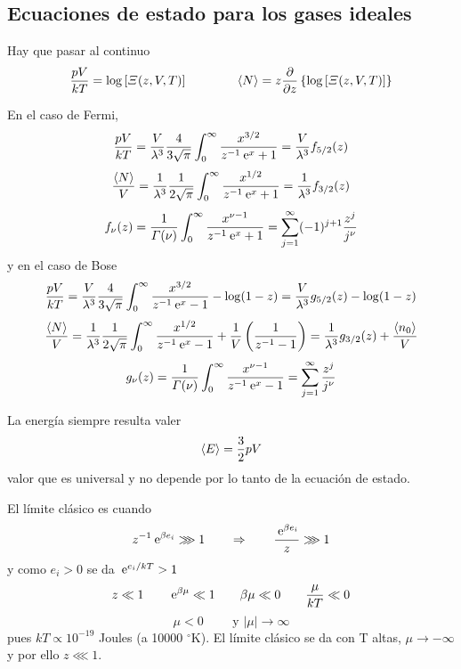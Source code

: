 \documentclass[10pt,oneside]{CBFT_book}
\begin{document}
\subsection{Ecuaciones de estado para los gases ideales}

Hay que pasar al continuo
\[
	\frac{pV}{kT} = \log \left[ \Xi (z,V,T) \right] \qquad \qquad 
	\braket{N} = z\frac{\partial^{\hspace{-0.05em}} {}}{\partial {z}^{\hspace{-0.05em}}}\left\{ \log \left[ \Xi (z,V,T) \right] \right\}
\]

En el caso de Fermi,
\[
	\frac{pV}{kT} = \frac{V}{\lambda^3} \frac{4}{3\sqrt{\pi}} \int_0^\infty 
	\frac{x^{3/2}}{z^{-1}\:\mathrm{e}^x + 1} = \frac{V}{\lambda^3} f_{5/2}(z)
\]
\[
	\frac{\braket{N}}{V} = \frac{1}{\lambda^3} \frac{1}{2\sqrt{\pi}} \int_0^\infty 
	\frac{x^{1/2}}{z^{-1}\:\mathrm{e}^x + 1} = \frac{1}{\lambda^3} f_{3/2}(z)
\]
\[
	f_\nu(z) = \frac{1}{\Gamma(\nu)} \int_0^\infty \frac{x^{\nu - 1}}{z^{-1}\:\mathrm{e}^x + 1} =
	\sum_{j=1}^\infty (-1)^{j+1} \frac{z^j}{j^\nu}
\]
y en el caso de Bose
\[
	\frac{pV}{kT} = \frac{V}{\lambda^3} \frac{4}{3\sqrt{\pi}} \int_0^\infty 
	\frac{x^{3/2}}{z^{-1}\:\mathrm{e}^x - 1} - \log ( 1 - z ) = 
	\frac{V}{\lambda^3} g_{5/2}(z) - \log ( 1 - z )
\]
\[
	\frac{\braket{N}}{V} = \frac{1}{\lambda^3} \frac{1}{2\sqrt{\pi}} \int_0^\infty 
	\frac{x^{1/2}}{z^{-1}\:\mathrm{e}^x - 1} + \frac{1}{V} \left( \frac{ 1 }{ z^{-1} - 1 } \right) = 
	\frac{1}{\lambda^3} g_{3/2}(z) + \frac{\braket{n_0}}{V}
\]
\[
	g_\nu(z) = \frac{1}{\Gamma(\nu)} \int_0^\infty \frac{x^{\nu - 1}}{z^{-1}\:\mathrm{e}^x - 1} =
	\sum_{j=1}^\infty \frac{z^j}{j^\nu}
\]



La energía siempre resulta valer
\[
	\braket{E} = \frac{3}{2}pV
\]
valor que es universal y no depende por lo tanto de la ecuación de estado.

El límite clásico es cuando 
\[
	z^{-1}\:\mathrm{e}^{\beta e_i} \ggg 1 \qquad \Rightarrow \qquad \frac{\:\mathrm{e}^{\beta e_i}}{z} \ggg 1
\]
y como $ e_i > 0 $ se da $ \:\mathrm{e}^{e_i/kT} > 1 $
\[
	z \ll 1 \qquad \:\mathrm{e}^{\beta\mu} \ll 1 \qquad \beta\mu \ll 0 \qquad \frac{\mu}{kT} \ll 0
\]
\[
	\mu < 0 \qquad \text{ y } |\mu| \to \infty 
\]
pues $ kT \propto 10^{-19} $ Joules (a 10000 $^\circ$K).
El límite clásico se da con T altas, $ \mu \to -\infty $ y por ello $ z \lll 1$.
\end{document}
